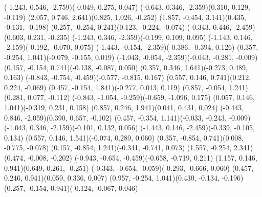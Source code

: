 \pstThreeDLine[linecolor=gray](-1.243, 0.546, -2.759)(-0.049, 0.275, 0.047)
\pstThreeDLine[linecolor=gray](-0.643, 0.346, -2.359)(0.310, 0.129, -0.119)
\pstThreeDLine[linecolor=black](2.057, 0.746, 2.641)(0.825, 1.026, -0.252)
\pstThreeDLine[linecolor=black](1.857, -0.454, 3.141)(0.435, -0.131, -0.198)
\pstThreeDLine[linecolor=black](0.257, -0.254, 0.241)(0.123, -0.224, -0.074)
\pstThreeDLine[linecolor=gray](-0.343, 0.446, -2.459)(0.603, 0.231, -0.235)
\pstThreeDLine[linecolor=gray](-1.243, 0.346, -2.359)(-0.199, 0.109, 0.095)
\pstThreeDLine[linecolor=gray](-1.143, 0.146, -2.159)(-0.192, -0.070, 0.075)
\pstThreeDLine[linecolor=gray](-1.443, -0.154, -2.359)(-0.386, -0.394, 0.126)
\pstThreeDLine[linecolor=black](0.357, -0.254, 1.041)(-0.079, -0.155, 0.019)
\pstThreeDLine[linecolor=gray](-1.043, -0.054, -2.359)(-0.043, -0.281, -0.009)
\pstThreeDLine[linecolor=black](0.157, -0.154, 0.741)(-0.138, -0.087, 0.050)
\pstThreeDLine[linecolor=black](0.357, 0.346, 1.641)(-0.273, 0.489, 0.163)
\pstThreeDLine[linecolor=gray](-0.843, -0.754, -0.459)(-0.577, -0.815, 0.167)
\pstThreeDLine[linecolor=black](0.557, 0.146, 0.741)(0.212, 0.224, -0.069)
\pstThreeDLine[linecolor=black](0.457, -0.154, 1.841)(-0.277, 0.013, 0.119)
\pstThreeDLine[linecolor=black](0.857, -0.054, 1.241)(0.281, 0.077, -0.112)
\pstThreeDLine[linecolor=gray](-0.843, -1.054, -0.259)(-0.659, -1.096, 0.175)
\pstThreeDLine[linecolor=black](0.057, 0.146, 1.041)(-0.319, 0.231, 0.158)
\pstThreeDLine[linecolor=black](0.857, 0.246, 1.941)(0.041, 0.431, 0.024)
\pstThreeDLine[linecolor=gray](-0.443, 0.846, -2.059)(0.390, 0.657, -0.102)
\pstThreeDLine[linecolor=black](0.457, -0.354, 1.141)(-0.033, -0.243, -0.009)
\pstThreeDLine[linecolor=gray](-1.043, 0.346, -2.159)(-0.101, 0.132, 0.056)
\pstThreeDLine[linecolor=gray](-1.443, 0.146, -2.459)(-0.339, -0.105, 0.134)
\pstThreeDLine[linecolor=black](0.557, 0.146, 1.541)(-0.074, 0.289, 0.060)
\pstThreeDLine[linecolor=black](0.357, -0.854, 0.741)(0.008, -0.775, -0.078)
\pstThreeDLine[linecolor=black](0.157, -0.854, 1.241)(-0.341, -0.741, 0.073)
\pstThreeDLine[linecolor=black](1.557, -0.254, 2.341)(0.474, -0.008, -0.202)
\pstThreeDLine[linecolor=gray](-0.943, -0.654, -0.459)(-0.658, -0.719, 0.211)
\pstThreeDLine[linecolor=black](1.157, 0.146, 0.941)(0.649, 0.261, -0.251)
\pstThreeDLine[linecolor=gray](-0.343, -0.654, -0.059)(-0.293, -0.666, 0.060)
\pstThreeDLine[linecolor=black](0.457, 0.246, 0.941)(0.059, 0.336, 0.007)
\pstThreeDLine[linecolor=black](0.957, -0.254, 1.041)(0.430, -0.134, -0.196)
\pstThreeDLine[linecolor=black](0.257, -0.154, 0.941)(-0.124, -0.067, 0.046)
